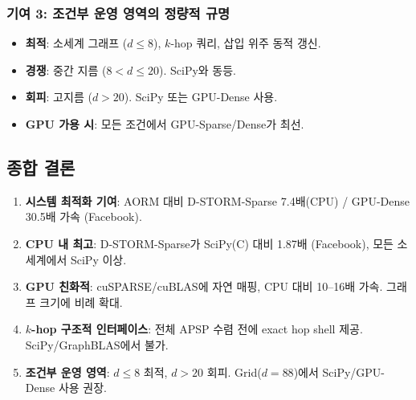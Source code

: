 \documentclass[11pt,a4paper]{article}
\begin{document}
\subsubsection{기여 3: 조건부 운영 영역의 정량적 규명}

\begin{tcolorbox}[colback=blue!5, colframe=blue!50!black, title=D-STORM의 운영 영역]
\begin{itemize}[leftmargin=1.4em]
  \item \textbf{최적}: 소세계 그래프 ($d \leq 8$), $k$-hop 쿼리, 삽입 위주 동적 갱신.
  \item \textbf{경쟁}: 중간 지름 ($8 < d \leq 20$). SciPy와 동등.
  \item \textbf{회피}: 고지름 ($d > 20$). SciPy 또는 GPU-Dense 사용.
  \item \textbf{GPU 가용 시}: 모든 조건에서 GPU-Sparse/Dense가 최선.
\end{itemize}
\end{tcolorbox}

\subsection{종합 결론}

\begin{tcolorbox}[colback=green!5, colframe=green!50!black, title=핵심 결론]
\begin{enumerate}[leftmargin=1.4em]
  \item \textbf{시스템 최적화 기여}: AORM 대비 D-STORM-Sparse 7.4배(CPU) / GPU-Dense 30.5배 가속 (Facebook).
  \item \textbf{CPU 내 최고}: D-STORM-Sparse가 SciPy(C) 대비 1.87배 (Facebook), 모든 소세계에서 SciPy 이상.
  \item \textbf{GPU 친화적}: cuSPARSE/cuBLAS에 자연 매핑, CPU 대비 10--16배 가속. 그래프 크기에 비례 확대.
  \item \textbf{$k$-hop 구조적 인터페이스}: 전체 APSP 수렴 전에 exact hop shell 제공. SciPy/GraphBLAS에서 불가.
  \item \textbf{조건부 운영 영역}: $d \leq 8$ 최적, $d > 20$ 회피. Grid($d\!=\!88$)에서 SciPy/GPU-Dense 사용 권장.
\end{enumerate}
\end{tcolorbox}
\end{document}
